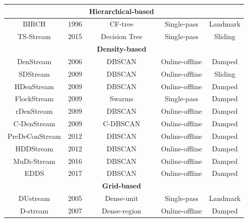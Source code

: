 \begin{table}[h]
\begin{tabular}{c c c c c}
        \hline
      \hline
       \rowcolor{lightgray}&& \rowcolor{lightgray}\centering\textbf{Hierarchical-based }  & &  \\
      \hline 
      \hline 
      BIRCH             &    1996        &     CF-tree           &  Single-pass    & Landmark \\
     \hline
      TS-Stream         &     2015       &    Decision Tree      & Single-pass     & Sliding  \\
      \hline
      \hline
     \rowcolor{lightgray}& &\rowcolor{lightgray}\centering \textbf{Density-based}  & &  \\
      \hline 
      \hline
    DenStream            &    2006     &    DBSCAN       & Online-offline  &   Damped   \\
     \hline
     SDStream            &    2009     &    DBSCAN       & Online-offline  &   Sliding \\
      \hline
      HDenStream         &     2009    &    DBSCAN       &  Online-offline &   Damped  \\
        \hline
      FlockStream        &     2009    &    Swarms       &  Single-pass    &   Damped  \\
        \hline 
      rDenStream         &    2009     &     DBSCAN      & Online-offline  &   Damped  \\
        \hline 
      C-DenStream        &    2009     &     C-DBSCAN    &Online-offline   &   Damped \\
          \hline 
      PreDeConStream     &    2012     &     DBSCAN      & Online-offline  &   Damped \\
          \hline 
      HDDStream          &    2012     &     DBSCAN      & Online-offline  &   Damped   \\
          \hline 
      MuDi-Stream        &    2016     &       DBSCAN    & Online-offline  &   Damped\\
      \hline          
      EDDS               &    2017     &     DBSCAN      & Online-offline  &   Damped \\
      \hline
      \hline
     \rowcolor{lightgray}& &\rowcolor{lightgray}\centering \textbf{Grid-based}  & &  \\
      \hline 
      \hline      
     DUstream            &    2005        &      Dense-unit       &     Single-pass    &  Landmark\\
      \hline
      D-stream           &     2007       &    Dense-region       &  Online-offline    &   Damped\\
    \hline 

\end{tabular}
\end{table}
